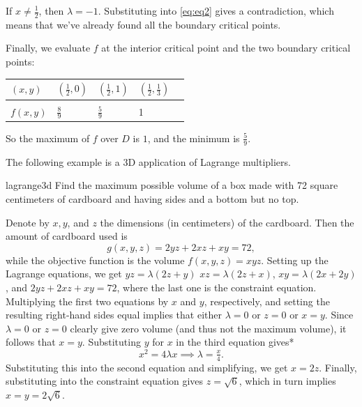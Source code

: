 \documentclass[indent]{watsonbook}
\begin{document}
{\begin{solution}
  If $x \neq \tfrac{1}{2}$, then $\lambda = -1$. Substituting into
  \eqref{eq:eq2} gives a contradiction, which means that we've
  already found all the boundary critical points.

  Finally, we evaluate $f$ at the interior critical point and the
  two boundary critical points: \vspace{-12pt}
  \begin{center}
    \begin{tabular}{M{1.2cm}|M{1.2cm}M{1.2cm}M{1.2cm}N}
      $(x,y)$ & $\left(\frac{1}{2}, 0\right)$  & $\left(\frac{1}{2},
                                                 1\right)$ &
                                                             $\left(\frac{1}{2},
                                                             \frac{1}{3} \right)$ &
      \\[12pt] \hline  \\[-8pt]
      $f(x,y)$ & $\frac{8}{9}$ & $\frac{5}{9}$ & 1 &  \\
    \end{tabular}
  \end{center}
  So the maximum of $f$ over $D$ is $1$, and the minimum is
  $\frac{5}{9}$.
\end{solution}

The following example is a 3D application of Lagrange multipliers.

\begin{example}{}{lagrange3d}
  Find the maximum possible volume of a box made with 72 square
  centimeters of cardboard and having sides and a bottom but no
  top.
\end{example}

\begin{solution}
  Denote by $x,y$, and $z$ the dimensions (in centimeters) of the
  cardboard. Then the amount of cardboard used is
  \[
    g(x,y,z) = 2yz + 2xz + xy = 72,
  \]
  while the objective function is the volume $f(x,y,z) =
  xyz$. Setting up the Lagrange equations, we get $yz = \lambda(2z + y)$
    $xz = \lambda(2z + x)$, $xy = \lambda(2x + 2y)$, and $2yz + 2xz + xy = 72$,
  where the last one is the constraint equation. Multiplying the
  first two equations by $x$ and $y$, respectively, and setting
  the resulting right-hand sides equal implies that either $\lambda
  = 0$ or $z= 0$ or  $x = y$. Since $\lambda = 0$ or $z = 0$ clearly
  give zero volume (and thus not the maximum volume), it follows
  that $x=y$. Substituting $y$ for $x$ in the third equation gives*
  \[
    x^2 = 4 \lambda x \implies \lambda = \tfrac{x}{4}.
  \]
  Substituting this into the second equation and simplifying, we get
  $x = 2z$. Finally, substituting into the constraint equation gives
  $z = \sqrt{6}$, which in turn implies $x = y = 2\sqrt{6}$.
\end{solution}

}
\end{document}
